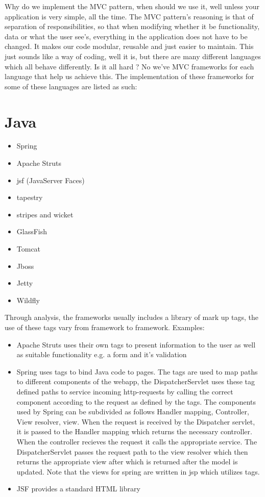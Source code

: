 Why do we implement the MVC pattern, when should we use it, well unless your application is very simple, all the time.
The MVC pattern's reasoning is that of separation of responsibilities, so that when modifying whether it be functionality, data or what the user see's, everything in the
application does not have to be changed. It makes our code modular, reusable and just easier to maintain.
This just sounds like a way of coding, well it is, but there are many different languages which all behave differently.
Is it all hard ? No  we've MVC frameworks for each language that help us achieve this. The implementation of these frameworks
for some of these languages are listed as such:

\section{Java}

\begin{itemize}
  \item Spring
  \item Apache Struts
  \item jsf (JavaServer Faces)
  \item tapestry
  \item stripes and wicket
  \item GlassFish
  \item Tomcat
  \item Jboss
  \item Jetty
  \item Wildfly
\end{itemize}

Through analysis, the frameworks usually includes a library of mark up tags, the use of these tags vary from framework to framework. Examples:
\begin{itemize}
  \item Apache Struts uses their own tags to present information to the user as well as suitable functionality e.g. a form and it's validation
  \item Spring uses tags to bind Java code to pages. The tags are used to map paths to different components of the webapp, the DispatcherServlet uses these tag defined paths to service incoming http-requests by calling the correct component according to the request as defined by the tags. The components used by Spring can be subdivided as follows Handler mapping, Controller, View resolver, view. When the request is received by the Dispatcher servlet, it is passed to the Handler mapping which returns the necessary controller. When the controller recieves the request it calls the appropriate service. The DispatcherServlet passes the request path to the view resolver which then returns the appropriate view after which is returned after the model is updated. Note that the views for spring are written in jsp which utilizes tags.
  \item JSF provides a standard HTML library
\end{itemize}\par


